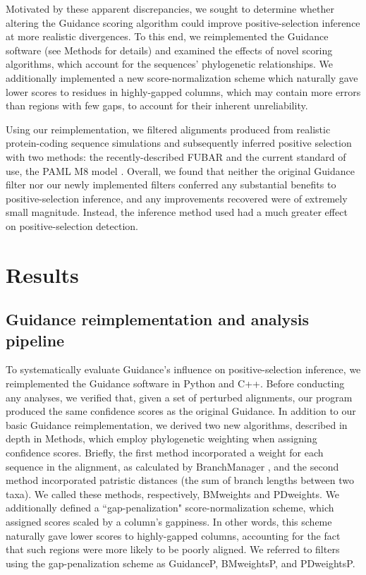 \documentclass[10pt]{article}
\begin{document}
Motivated by these apparent discrepancies, we sought to determine whether altering the Guidance scoring algorithm could improve positive-selection inference at more realistic divergences. To this end, we reimplemented the Guidance software (see Methods for details) and examined the effects of novel scoring algorithms, which account for the sequences' phylogenetic relationships. We additionally implemented a new score-normalization scheme which naturally gave lower scores to residues in highly-gapped columns, which may contain more errors than regions with few gaps, to account for their inherent unreliability.

Using our reimplementation, we filtered alignments produced from realistic protein-coding sequence simulations and subsequently inferred positive selection with two methods: the recently-described FUBAR \citep{Murrell2013} and the current standard of use, the PAML M8 model \citep{Yang2007}. Overall, we found that neither the original Guidance filter nor our newly implemented filters conferred any substantial benefits to positive-selection inference, and any improvements recovered were of extremely small magnitude. Instead, the inference method used had a much greater effect on positive-selection detection.


\section*{Results}

\subsection*{Guidance reimplementation and analysis pipeline}
To systematically evaluate Guidance's influence on positive-selection inference, we reimplemented the Guidance software in Python and C++. Before conducting any analyses, we verified that, given a set of perturbed alignments, our program produced the same confidence scores as the original Guidance. In addition to our basic Guidance reimplementation, we derived two new algorithms, described in depth in Methods, which employ phylogenetic weighting when assigning confidence scores. Briefly, the first method incorporated a weight for each sequence in the alignment, as calculated by BranchManager \citep{Stone2007}, and the second method incorporated patristic distances (the sum of branch lengths between two taxa). We called these methods, respectively, BMweights and PDweights.  We additionally defined a ``gap-penalization" score-normalization scheme, which assigned scores scaled by a column's gappiness. In other words, this scheme naturally gave lower scores to highly-gapped columns, accounting for the fact that such regions were more likely to be poorly aligned. We referred to filters using the gap-penalization scheme as GuidanceP, BMweightsP, and PDweightsP.
\end{document}
